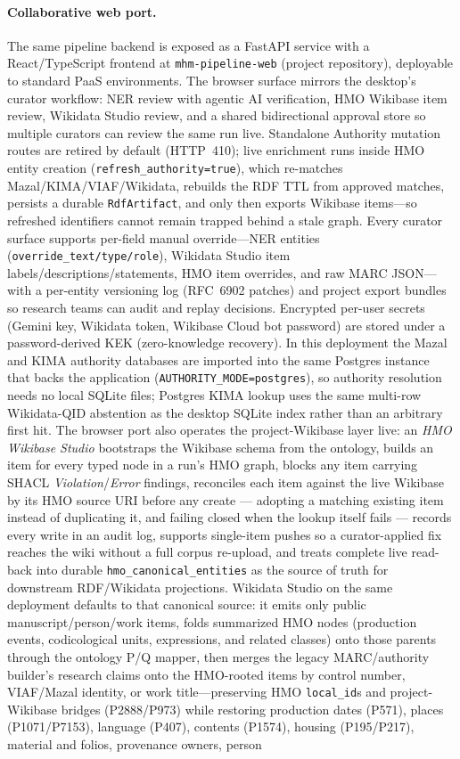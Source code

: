 \documentclass[Afour,sageh,times]{sagej}
\begin{document}
\paragraph{Collaborative web port.} The same pipeline backend is exposed as a FastAPI service with a React/TypeScript frontend at \texttt{mhm-pipeline-web} (project repository), deployable to standard PaaS environments. The browser surface mirrors the desktop's curator workflow: NER review with agentic AI verification, HMO Wikibase item review, Wikidata Studio review, and a shared bidirectional approval store so multiple curators can review the same run live. Standalone Authority mutation routes are retired by default (HTTP~410); live enrichment runs inside HMO entity creation (\texttt{refresh\_authority=true}), which re-matches Mazal/KIMA/VIAF/Wikidata, rebuilds the RDF TTL from approved matches, persists a durable \texttt{RdfArtifact}, and only then exports Wikibase items---so refreshed identifiers cannot remain trapped behind a stale graph. Every curator surface supports per-field manual override---NER entities (\texttt{override\_text/type/role}), Wikidata Studio item labels/descriptions/statements, HMO item overrides, and raw MARC JSON---with a per-entity versioning log (RFC~6902 patches) and project export bundles so research teams can audit and replay decisions. Encrypted per-user secrets (Gemini key, Wikidata token, Wikibase Cloud bot password) are stored under a password-derived KEK (zero-knowledge recovery). In this deployment the Mazal and KIMA authority databases are imported into the same Postgres instance that backs the application (\texttt{AUTHORITY\_MODE=postgres}), so authority resolution needs no local SQLite files; Postgres KIMA lookup uses the same multi-row Wikidata-QID abstention as the desktop SQLite index rather than an arbitrary first hit. The browser port also operates the project-Wikibase layer live: an \emph{HMO Wikibase Studio} bootstraps the Wikibase schema from the ontology, builds an item for every typed node in a run's HMO graph, blocks any item carrying SHACL \emph{Violation}/\emph{Error} findings, reconciles each item against the live Wikibase by its HMO source URI before any create --- adopting a matching existing item instead of duplicating it, and failing closed when the lookup itself fails --- records every write in an audit log, supports single-item pushes so a curator-applied fix reaches the wiki without a full corpus re-upload, and treats complete live read-back into durable \texttt{hmo\_canonical\_entities} as the source of truth for downstream RDF/Wikidata projections. Wikidata Studio on the same deployment defaults to that canonical source: it emits only public manuscript/person/work items, folds summarized HMO nodes (production events, codicological units, expressions, and related classes) onto those parents through the ontology P/Q mapper, then merges the legacy MARC/authority builder's research claims onto the HMO-rooted items by control number, VIAF/Mazal identity, or work title---preserving HMO \texttt{local\_id}s and project-Wikibase bridges (P2888/P973) while restoring production dates (P571), places (P1071/P7153), language (P407), contents (P1574), housing (P195/P217), material and folios, provenance owners, person 
\end{document}
